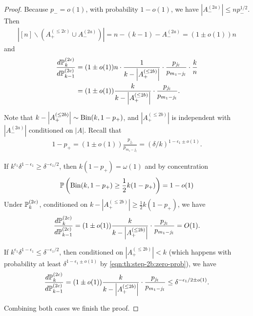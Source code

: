\begin{proof}
  Because $p_-=o(1)$, with probability $1-o(1)$, we have $\left|A_-^{(2a)}\right| \le n p_-^{1/2}$.
  Then
  \begin{align*}
    \left| [n]\backslash \left(A_+^{(\le 2c)} \cup A_-^{(2a)}\right) \right|
    = n-(k-1) - A_-^{(2a)} = (1\pm o(1)) n
  \end{align*}
  and
  \begin{align*}
    \frac{d \mathbb{P}^{(2c)}_k}{d \mathbb{P}^{(2c)}_{k-1}}
    &= (1\pm o(1)) n \cdot \frac{1}{k-\left| A_+^{(\le 2b)} \right|} \cdot \frac{p_{j_l}}{p_{m_1-j_l}} \cdot \frac kn\\
    \nonumber &= (1\pm o(1)) \frac{k}{k-\left| A_+^{(\le 2b)} \right|} \cdot \frac{p_{j_l}}{p_{m_1-j_l}}.
  \end{align*}

  Note that $k-\left| A_+^{(\le 2b)} \right|\sim \operatorname{\mathrm{Bin}}(k,1-p_+)$, and $\left| A_+^{(\le 2b)} \right|$ is independent with $\left|A_-^{(2a)}\right|$ conditioned on $|A|$. Recall that
  \begin{align*}
    1-p_+ = (1\pm o(1)) \frac{p_{j_l}}{p_{m_1-j_l}} = (\delta/k)^{1-\epsilon_1 \pm o(1)}.
  \end{align*}

  If $k^{\epsilon_1} \delta^{1-\epsilon_1} \ge \delta^{-\epsilon_1/2}$, then $k (1-p_+) = \omega(1)$ and by concentration
  \begin{align*}
    \mathbb{P}\left( \operatorname{\mathrm{Bin}}(k,1-p_+) \ge \frac 12 k(1-p_+) \right) = 1-o(1)
  \end{align*}
  Under $\mathbb{P}^{(2c)}_k$, conditioned on $k-\left| A_+^{(\le 2b)} \right| \ge \frac 12 k(1-p_+)$, we have
  \begin{align*}
    \frac{d \mathbb{P}^{(2c)}_k}{d \mathbb{P}^{(2c)}_{k-1}}
    = (1\pm o(1)) \frac{k}{k-\left| A_+^{(\le 2b)} \right|} \cdot \frac{p_{j_l}}{p_{m_1-j_l}}
    = O(1).
  \end{align*}

  If $k^{\epsilon_1} \delta^{1-\epsilon_1} \le \delta^{-\epsilon_1/2}$, then conditioned on $\left| A_+^{(\le 2b)} \right| < k$ (which happens with probability at least $\delta^{1-\epsilon_1\pm o(1)}$ by \cref{eqn:th:step-2b:zero-prob}), we have
  \begin{align*}
    \frac{d \mathbb{P}^{(2c)}_k}{d \mathbb{P}^{(2c)}_{k-1}}
    = (1\pm o(1)) \frac{k}{k-\left| A_+^{(\le 2b)} \right|} \cdot \frac{p_{j_l}}{p_{m_1-j_l}}
    \le \delta^{-\epsilon_1/2 \pm o(1)}.
  \end{align*}

  Combining both cases we finish the proof.
\end{proof}
